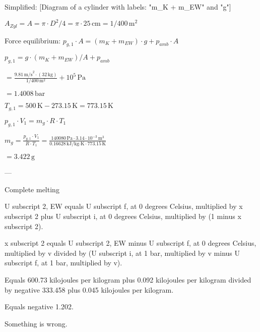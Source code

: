 Simplified:  
[Diagram of a cylinder with labels: "m_K + m_EW" and "g"]  

\( A_{Zyl} = A = \pi \cdot D^2 / 4 = \pi \cdot 25 \, \text{cm} = 1 / 400 \, \text{m}^2 \)  

Force equilibrium:  
\( p_{g,1} \cdot A = (m_K + m_{EW}) \cdot g + p_{amb} \cdot A \)  

\( p_{g,1} = g \cdot (m_K + m_{EW}) / A + p_{amb} \)  

\( = \frac{9.81 \, \text{m/s}^2 \cdot (32 \, \text{kg})}{1 / 400 \, \text{m}^2} + 10^5 \, \text{Pa} \)  

\( = 1.4008 \, \text{bar} \)  

\( T_{g,1} = 500 \, \text{K} - 273.15 \, \text{K} = 773.15 \, \text{K} \)  

\( p_{g,1} \cdot V_1 = m_g \cdot R \cdot T_1 \)  

\( m_g = \frac{p_{g,1} \cdot V_1}{R \cdot T_1} = \frac{140080 \, \text{Pa} \cdot 3.14 \cdot 10^{-3} \, \text{m}^3}{0.16628 \, \text{kJ/kg·K} \cdot 773.15 \, \text{K}} \)  

\( = 3.422 \, \text{g} \)  

---

Complete melting  

U subscript 2, EW equals U subscript f, at 0 degrees Celsius, multiplied by x subscript 2 plus U subscript i, at 0 degrees Celsius, multiplied by (1 minus x subscript 2).  

x subscript 2 equals U subscript 2, EW minus U subscript f, at 0 degrees Celsius, multiplied by v divided by (U subscript i, at 1 bar, multiplied by v minus U subscript f, at 1 bar, multiplied by v).  

Equals 600.73 kilojoules per kilogram plus 0.092 kilojoules per kilogram divided by negative 333.458 plus 0.045 kilojoules per kilogram.  

Equals negative 1.202.  

Something is wrong.